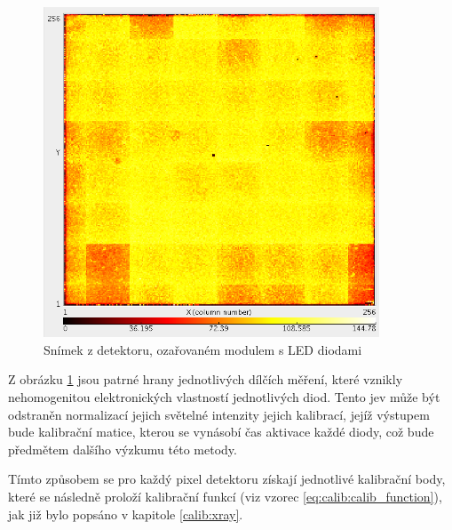 \begin{figure}[th]
	\begin{center}
		\includegraphics[width=10cm]{figures/led_calib_frame.png}
		\caption{Snímek z detektoru, ozařovaném modulem s LED diodami}
		\label{fig:calib:led_frame}
	\end{center}
\end{figure}

Z obrázku \ref{fig:calib:led_frame} jsou patrné hrany jednotlivých dílčích měření, které vznikly nehomogenitou elektronických vlastností jednotlivých diod. Tento jev může být odstraněn normalizací jejich světelné intenzity jejich kalibrací, jejíž výstupem bude kalibrační matice, kterou se vynásobí čas aktivace každé diody, což bude předmětem dalšího výzkumu této metody.

Tímto způsobem se pro každý pixel detektoru získají jednotlivé kalibrační body, které se následně proloží kalibrační funkcí (viz vzorec \ref{eq:calib:calib_function}), jak již bylo popsáno v kapitole \ref{calib:xray}.



































